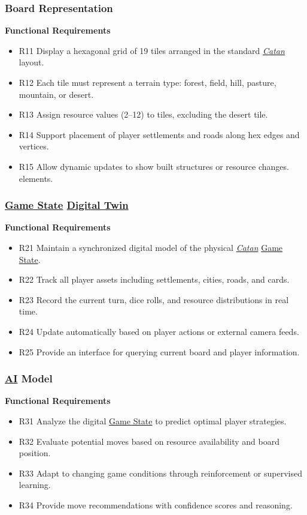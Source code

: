 \documentclass{article}
\newcommand{\Catan}{\href{https://en.wikipedia.org/wiki/Catan}{Catan}}
\newcommand{\AI}{\href{https://en.wikipedia.org/wiki/Artificial_intelligence}{AI}}
\newcommand{\DigitalTwin}{\href{https://en.wikipedia.org/wiki/Digital_twin}{Digital Twin}}
\newcommand{\GameState}{\href{https://milvus.io/ai-quick-reference/what-is-a-state-in-rl}{Game State}}
\begin{document}
\subsubsection{Board Representation}
\label{subsubsec:board-representation}

\textbf{Functional Requirements}

\begin{itemize}
  \item R11 Display a hexagonal grid of 19 tiles arranged in the standard 
  \emph{\Catan{}} layout.
  \item R12 Each tile must represent a terrain type: forest, field, hill, 
  pasture, mountain, or desert.
  \item R13 Assign resource values (2--12) to tiles, excluding the desert tile.
  \item R14 Support placement of player settlements and roads along hex edges
        and vertices.
  \item R15 Allow dynamic updates to show built structures or resource changes.
  elements.
\end{itemize}

\subsubsection{\GameState{} \DigitalTwin{}}

\textbf{Functional Requirements}

\begin{itemize}
  \item R21 Maintain a synchronized digital model of the physical \emph{\Catan{}} \GameState{}.
  \item R22 Track all player assets including settlements, cities, roads, and cards.
  \item R23 Record the current turn, dice rolls, and resource distributions in real time.
  \item R24 Update automatically based on player actions or external camera feeds.
  \item R25 Provide an interface for querying current board and player information.
\end{itemize}

\subsubsection{\AI{} Model}

\textbf{Functional Requirements}

\begin{itemize}
  \item R31 Analyze the digital \GameState{} to predict optimal player strategies.
  \item R32 Evaluate potential moves based on resource availability and board position.
  \item R33 Adapt to changing game conditions through reinforcement or supervised learning.
  \item R34 Provide move recommendations with confidence scores and reasoning.
\end{itemize}
\end{document}
